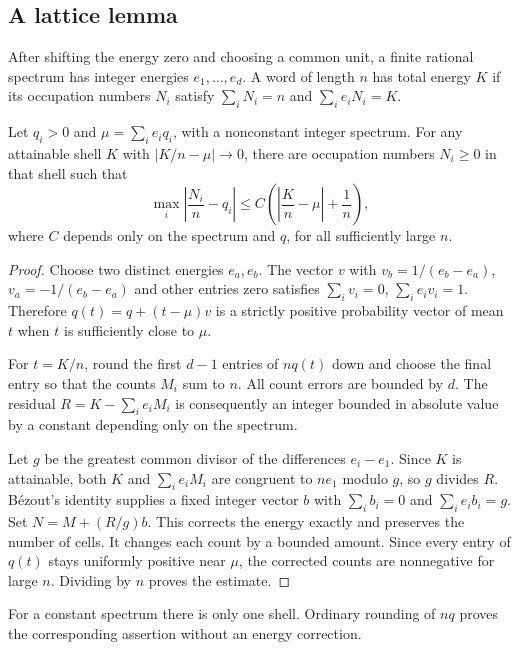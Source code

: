 \subsection{A lattice lemma}
After shifting the energy zero and choosing a common unit, a finite rational spectrum has integer energies $e_1,\ldots,e_d$. A word of length $n$ has total energy $K$ if its occupation numbers $N_i$ satisfy $\sum_i N_i=n$ and $\sum_i e_iN_i=K$.
\begin{lemma}\label{lem:lattice}
Let $q_i>0$ and $\mu=\sum_i e_iq_i$, with a nonconstant integer spectrum. For any attainable shell $K$ with $|K/n-\mu|\to0$, there are occupation numbers $N_i\ge0$ in that shell such that
\[
 \max_i\left|\frac{N_i}{n}-q_i\right|
 \le C\left(\left|\frac Kn-\mu\right|+\frac1n\right),
\]
where $C$ depends only on the spectrum and $q$, for all sufficiently large $n$.
\end{lemma}
\begin{proof}
Choose two distinct energies $e_a,e_b$. The vector $v$ with $v_b=1/(e_b-e_a)$, $v_a=-1/(e_b-e_a)$ and other entries zero satisfies $\sum_i v_i=0$, $\sum_i e_iv_i=1$. Therefore $q(t)=q+(t-\mu)v$ is a strictly positive probability vector of mean $t$ when $t$ is sufficiently close to $\mu$.

For $t=K/n$, round the first $d-1$ entries of $nq(t)$ down and choose the final entry so that the counts $M_i$ sum to $n$. All count errors are bounded by $d$. The residual $R=K-\sum_i e_iM_i$ is consequently an integer bounded in absolute value by a constant depending only on the spectrum.

Let $g$ be the greatest common divisor of the differences $e_i-e_1$. Since $K$ is attainable, both $K$ and $\sum_i e_iM_i$ are congruent to $ne_1$ modulo $g$, so $g$ divides $R$. B\'ezout's identity supplies a fixed integer vector $b$ with $\sum_i b_i=0$ and $\sum_i e_ib_i=g$. Set $N=M+(R/g)b$. This corrects the energy exactly and preserves the number of cells. It changes each count by a bounded amount. Since every entry of $q(t)$ stays uniformly positive near $\mu$, the corrected counts are nonnegative for large $n$. Dividing by $n$ proves the estimate.
\end{proof}
For a constant spectrum there is only one shell. Ordinary rounding of $nq$ proves the corresponding assertion without an energy correction.

